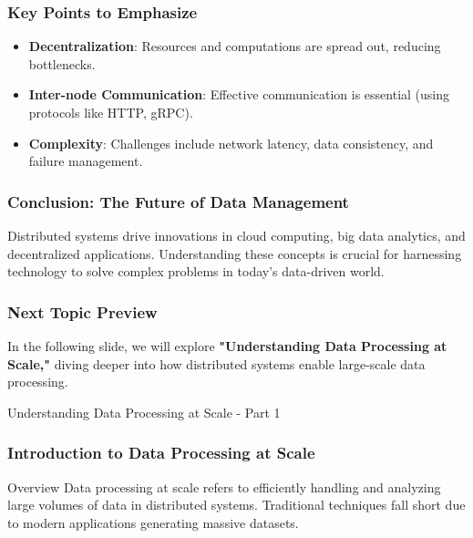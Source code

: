 \documentclass[aspectratio=169]{beamer}
\begin{document}
\begin{frame}[fragile]
    \frametitle{Key Points to Emphasize}
    \begin{itemize}
        \item \textbf{Decentralization}: Resources and computations are spread out, reducing bottlenecks.
        \item \textbf{Inter-node Communication}: Effective communication is essential (using protocols like HTTP, gRPC).
        \item \textbf{Complexity}: Challenges include network latency, data consistency, and failure management.
    \end{itemize}
\end{frame}

\begin{frame}[fragile]
    \frametitle{Conclusion: The Future of Data Management}
    Distributed systems drive innovations in cloud computing, big data analytics, and decentralized applications. 
    Understanding these concepts is crucial for harnessing technology to solve complex problems in today’s 
    data-driven world.
\end{frame}

\begin{frame}[fragile]
    \frametitle{Next Topic Preview}
    In the following slide, we will explore 
    \textbf{"Understanding Data Processing at Scale,"} diving deeper into how distributed systems enable 
    large-scale data processing. 
\end{frame}

\begin{frame}[fragile]{Understanding Data Processing at Scale - Part 1}
    \frametitle{Introduction to Data Processing at Scale}
    \begin{block}{Overview}
        Data processing at scale refers to efficiently handling and analyzing large volumes of data in distributed systems. Traditional techniques fall short due to modern applications generating massive datasets.
    \end{block}
\end{frame}
\end{document}
